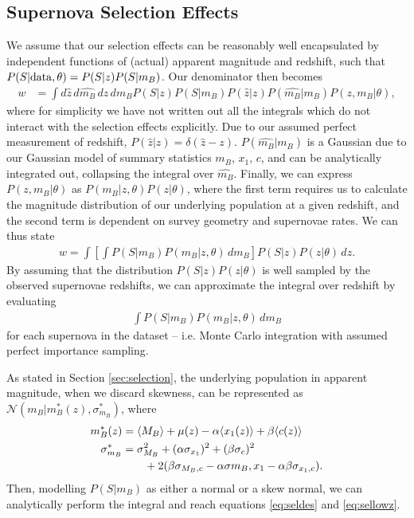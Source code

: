 \documentclass[a4paper,fleqn,usenatbib]{mnras}
\begin{document}
\subsection{Supernova Selection Effects}

We assume that our selection effects can be reasonably well encapsulated by independent functions of (actual) apparent magnitude and redshift, such that $P(S|{\rm data}, \theta) = P(S|z) P(S|m_B)$. Our denominator then becomes
\begin{align}
w &= \int d\hat{z} \, d\hat{m_B} \, dz \, dm_B P(S|z) P(S|m_B) P(\hat{z}|z) P(\hat{m_B}|m_B) P(z, m_B | \theta),
\end{align}
where for simplicity we have not written out all the integrals which do not interact with the selection effects explicitly. Due to our assumed perfect measurement of redshift, $P(\hat{z}|z) = \delta(\hat{z} - z)$. $P(\hat{m_B} | m_B)$ is a Gaussian due to our Gaussian model of summary statistics $m_B$, $x_1$, $c$, and can be analytically integrated out, collapsing the integral over $\hat{m_B}$. Finally, we can express $P(z, m_B | \theta)$ as  $P(m_B | z, \theta) P(z | \theta)$, where the first term requires us to calculate the magnitude distribution of our underlying population at a given redshift, and the second term is dependent on survey geometry and supernovae rates. We can thus state
\begin{align}
w = \int \left[ \int P(S|m_B) P(m_B | z, \theta)\, dm_B \right] P(S|z)P(z|\theta)\, dz.
\end{align}
By assuming that the distribution $P(S|z)P(z|\theta)$ is well sampled by the observed supernovae redshifts, we can approximate the integral over redshift by evaluating
\begin{align}
\int P(S|m_B) P(m_B | z, \theta)\, dm_B
\end{align}
for each supernova in the dataset -- i.e. Monte Carlo integration with assumed perfect importance sampling.

As stated in Section \ref{sec:selection}, the underlying population in apparent magnitude, when we discard skewness, can be represented as $\mathcal{N}(m_B|m_B^*(z), \sigma^*_{m_B})$, where
\begin{align}
m_B^*(z) &= \langle M_B \rangle + \mu(z) - \alpha \langle x_1(z) \rangle + \beta \langle c(z) \rangle\label{eq:disc1} \\
\sigma^*_{m_B} &= \sigma_{M_B}^2 + (\alpha \sigma_{x_1})^2 + (\beta \sigma_c)^2 \notag\\ 
&\quad\quad + 2(\beta \sigma_{M_B,c} - \alpha \sigma{m_B,x_1} - \alpha \beta \sigma_{x_1,c}). \label{eq:disc2}
\end{align}
Then, modelling $P(S|m_B)$ as either a normal or a skew normal, we can analytically perform the integral and reach equations \eqref{eq:seldes} and \eqref{eq:sellowz}.
\end{document}
